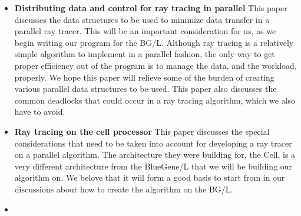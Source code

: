 \documentclass{acmsiggraph}
\begin{document}
\begin{itemize}
\item
\textbf{Distributing data and control for ray tracing in parallel} This paper
discusses the data structures to be used to minimize data transfer in a
parallel ray tracer. This will be an important consideration for us, as we
begin writing our program for the BG/L. Although ray tracing is a relatively
simple algorithm to implement in a parallel fashion, the only way to get proper
efficiency out of the program is to manage the data, and the workload,
properly. We hope this paper will relieve some of the burden of creating
various parallel data structures to be used. This paper also discusses the
common deadlocks that could occur in a ray tracing algorithm, which we also
have to avoid.\cite{badouel1994dda}
\item
\textbf{Ray tracing on the cell processor} This paper discusses the special
considerations that need to be taken into account for developing a ray tracer
on a parallel algorithm. The architecture they were building for, the Cell, is
a very different architecture from the BlueGene/L that we will be building our
algorithm on. We belove that it will form a good basis to start from in our
discussions about how to create the algorithm on the BG/L.\cite{benthin2006rtc}
\item
\end{itemize}



\end{document}
